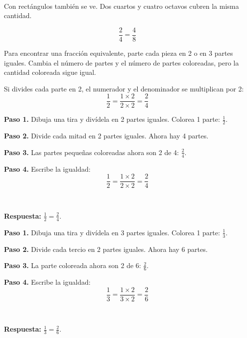 \begin{center}
\\[2pt]
\\[6pt]
\\[2pt]
\end{center}

Con rectángulos también se ve. Dos cuartos y cuatro octavos cubren la misma cantidad.

\begin{center}
\hspace{0.8cm}
\end{center}

\[
\frac{2}{4}=\frac{4}{8}
\]

\begin{wbidea}
Para encontrar una fracción equivalente, parte cada pieza en 2 o en 3 partes iguales. Cambia el número de partes y el número de partes coloreadas, pero la cantidad coloreada sigue igual.

Si divides cada parte en 2, el numerador y el denominador se multiplican por 2:
\[
\frac{1}{2}=\frac{1\times2}{2\times2}=\frac{2}{4}
\]
\end{wbidea}

\begin{wbexample}
\textbf{Paso 1.} Dibuja una tira y divídela en 2 partes iguales. Colorea 1 parte: $\frac{1}{2}$.

\textbf{Paso 2.} Divide cada mitad en 2 partes iguales. Ahora hay 4 partes.

\textbf{Paso 3.} Las partes pequeñas coloreadas ahora son 2 de 4: $\frac{2}{4}$.

\textbf{Paso 4.} Escribe la igualdad:
\[
\frac{1}{2}=\frac{1\times2}{2\times2}=\frac{2}{4}
\]

\begin{center}
\\[2pt]
\end{center}

\textbf{Respuesta:} $\frac{1}{2}=\frac{2}{4}$.
\end{wbexample}

\begin{wbexample}
\textbf{Paso 1.} Dibuja una tira y divídela en 3 partes iguales. Colorea 1 parte: $\frac{1}{3}$.

\textbf{Paso 2.} Divide cada tercio en 2 partes iguales. Ahora hay 6 partes.

\textbf{Paso 3.} La parte coloreada ahora son 2 de 6: $\frac{2}{6}$.

\textbf{Paso 4.} Escribe la igualdad:
\[
\frac{1}{3}=\frac{1\times2}{3\times2}=\frac{2}{6}
\]

\begin{center}
\\[2pt]
\end{center}

\textbf{Respuesta:} $\frac{1}{3}=\frac{2}{6}$.
\end{wbexample}

